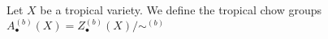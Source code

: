 

    Let $X$ be a tropical variety. We define the tropical chow groups $A^{(b)}_\bullet(X)=Z^{(b)}_\bullet(X)/\sim^{(b)}$

